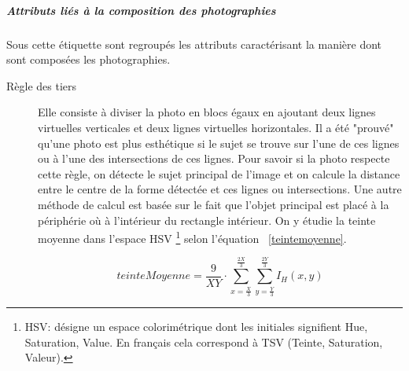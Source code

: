 \documentclass[11pt, french]{report-rd-info}
\begin{document}
\subparagraph{Attributs liés à la composition des photographies}
Sous cette étiquette sont regroupés les attributs caractérisant la manière dont sont composées les photographies. 
\begin{description}
\item[Règle des tiers]
Elle consiste à diviser la photo en blocs égaux en ajoutant deux lignes virtuelles verticales et deux lignes virtuelles horizontales. Il a  été "prouvé" qu’une photo est plus esthétique si le sujet se trouve sur l’une de ces lignes ou à l’une des intersections de ces lignes. Pour savoir si la photo respecte cette règle, on détecte le sujet principal de l’image et on calcule la distance entre le centre de la forme détectée et ces lignes ou intersections. Une autre méthode de calcul est basée sur le fait que l'objet principal est placé à la périphérie où à l'intérieur du rectangle intérieur. On y étudie la teinte moyenne dans l'espace HSV \footnote{HSV: désigne un espace colorimétrique dont les initiales signifient Hue, Saturation, Value. En français cela correspond à TSV (Teinte, Saturation, Valeur).} selon l'équation ~\ref{teintemoyenne}. 

\begin{equation}
teinteMoyenne = \frac{9}{XY}\cdot \sum_{x=\frac{X}{3}}^{\frac{2X}{3}} \sum_{y=\frac{Y}{3}}^{\frac{2Y}{3}} I_H(x,y)
\label{teintemoyenne}
\end{equation}


\end{description}
\end{document}
